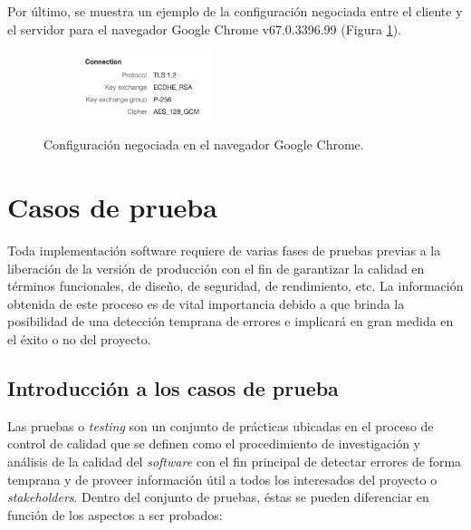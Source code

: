 \documentclass[12pt,a4paper, twoside]{report}
\begin{document}
	Por último, se muestra un ejemplo de la configuración negociada entre el cliente y el servidor para el navegador Google Chrome v67.0.3396.99 (Figura \ref{fig:handshake}). \\ 
		
	\begin{figure}[!ht]   
		\caption{Configuración negociada en el navegador Google Chrome.} 
		\begin{center} 
			\includegraphics[width=6cm,height=2cm]{Images/implement/handshake} \\
			\label{fig:handshake} 
		\end{center}  
	\end{figure}	
											
	\chapter{Casos de prueba} \label{testingChapter}
	
	Toda implementación software requiere de varias fases de pruebas previas a la liberación de la versión de producción con el fin de garantizar la calidad en términos funcionales, de diseño, de seguridad, de rendimiento, etc. La información obtenida de este proceso es de vital importancia debido a que brinda la posibilidad de una detección temprana de errores e implicará en gran medida en el éxito o no del proyecto.
	
	\section{Introducción a los casos de prueba}
	
	Las pruebas o \textit{testing} son un conjunto de prácticas ubicadas en el proceso de control de calidad que se definen como el procedimiento de investigación y análisis de la calidad del \textit{software} con el fin principal de detectar errores de forma temprana y de proveer información útil a todos los interesados del proyecto o \textit{\glspl{stakeholder}}. Dentro del conjunto de pruebas, éstas se pueden diferenciar en función de los aspectos a ser probados:
	
\end{document}
